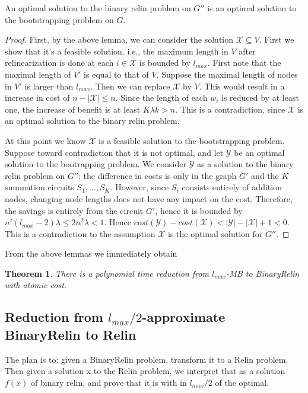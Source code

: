 \documentclass[11pt]{article} %
\theoremstyle{plain}
\newtheorem{theorem}{Theorem}
\theoremstyle{definition}
\begin{document}
\begin{lemma}
An optimal solution to the binary relin problem on $G''$ is an optimal solution to the bootstrapping problem on $G$. 
\end{lemma}
\begin{proof}
First, by the above lemma, we can consider the solution $\mathscr{X} \subseteq V$. First we show that it's a feasible solution. i.e., the maximum 
length in $V$ after relinearization is done at each $i \in \mathscr{X}$ is bounded by $l_{max}$. First note that the maximal length of $V'$ is equal to that of $V$. Suppose the maximal length of nodes in $V'$ is larger than $l_{max}$. Then we can replace $\mathscr{X}$ by $V$. This would result 
in a increase in cost of $n - |\mathscr{X}| \leq n$. Since the length of each $w_i$ is reduced by at least one, the increase of benefit is at least $K \lambda k > n$. This is a contradiction, since $\mathscr{X}$ is an optimal solution to the 
binary relin problem.  

At this point we know $\mathscr{X}$ is a feasible solution to the bootstrapping problem. Suppose toward contradiction that it is not optimal, and let  $\mathscr{Y}$ be an optimal solution to the bootrapping problem. We consider $\mathscr{Y}$ as a solution to the binary relin problem on $G''$: the difference in costs is only in the graph $G'$ and the $K$ summation circuits $S_1, \ldots, S_K$. However, since $S_i$ consists entirely of addition nodes, changing node lengths does not have any impact on the cost. Therefore, the savings is entirely from the circuit $G'$, hence it is bounded by $n' (l_{max} - 2) \lambda \leq 2n^2 \lambda < 1$. Hence 
$cost(\mathscr{Y}) - cost(\mathscr{X}) < |\mathscr{Y}| - |\mathscr{X}| + 1 < 0$. This is a contradiction to the assumption  $\mathscr{X}$ is the optimal solution for $G''$. 
\end{proof}

From the above lemmas we immediately obtain
\begin{theorem}
There is a polynomial time reduction from $l_{max}$-MB to BinaryRelin with atomic cost. 
\end{theorem}

\subsection{Reduction from $l_{max} / 2$-approximate BinaryRelin to Relin}

The plan is to: given a BinaryRelin problem, transform it to a Relin problem. 
Then given a solution x to the Relin problem, we interpret that as a solution $f(x)$ of binary relin, and prove that it is with in $l_{max}/2$ of the optimal. 
\end{document}
